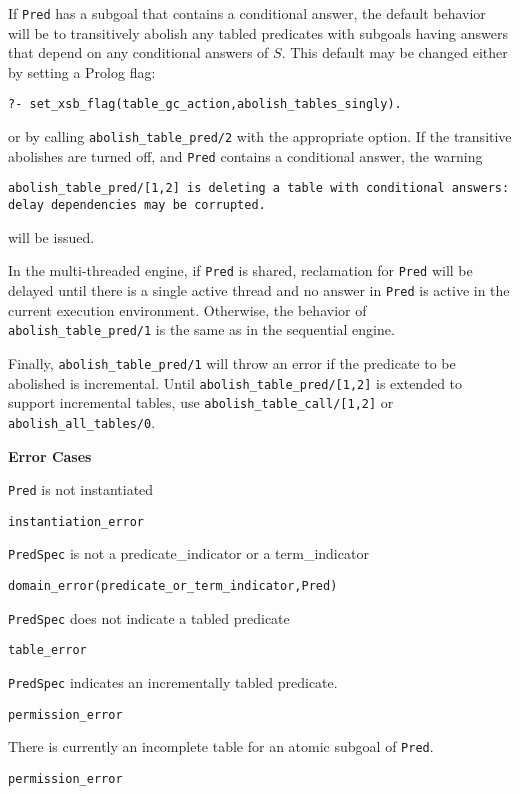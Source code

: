 \begin{description}
\begin{description}
If {\tt Pred} has a subgoal that contains a conditional answer, the
default behavior will be to transitively abolish any tabled predicates
with subgoals having answers that depend on any conditional answers of
$S$.  This default may be changed either by setting a Prolog flag:
%
\begin{verbatim}
?- set_xsb_flag(table_gc_action,abolish_tables_singly).
\end{verbatim}
% 
or by calling {\tt abolish\_table\_pred/2} with the appropriate
option.  If the transitive abolishes are turned off, and {\tt Pred}
contains a conditional answer, the warning

{\tt abolish\_table\_pred/[1,2] is deleting a table with
  conditional\ answers: \\ delay dependencies may be corrupted.}

will be issued.  

In the multi-threaded engine, if {\tt Pred} is shared, reclamation for
{\tt Pred} will be delayed until there is a single active thread and
no answer in {\tt Pred} is active in the current execution
environment.  Otherwise, the behavior of {\tt abolish\_table\_pred/1}
is the same as in the sequential engine.

Finally, {\tt abolish\_table\_pred/1} will throw an error if the
predicate to be abolished is incremental.  
%
%
Until {\tt abolish\_table\_pred/[1,2]} is extended to support
incremental tables, use {\tt abolish\_table\_call/[1,2]} or {\tt
  abolish\_all\_tables/0}.

{\bf Error Cases}
\bi
%
\item {\tt Pred} is not instantiated
 \bi 
 \item 	{\tt instantiation\_error}
 \ei
%
\item {\tt PredSpec} is not a predicate\_indicator or a term\_indicator
 \bi
 \item 	{\tt domain\_error(predicate\_or\_term\_indicator,Pred)}
 \ei
%
\item {\tt PredSpec} does not indicate a tabled predicate
  \bi
 \item 	{\tt table\_error}
 \ei
%
\item {\tt PredSpec} indicates an incrementally tabled predicate.  
\bi
 \item 	{\tt permission\_error}
 \ei
\item There is currently an incomplete table for an atomic subgoal of
  {\tt Pred}.
\bi
 \item 	{\tt permission\_error}
 \ei
%
\ei


\end{description}
\end{description}
